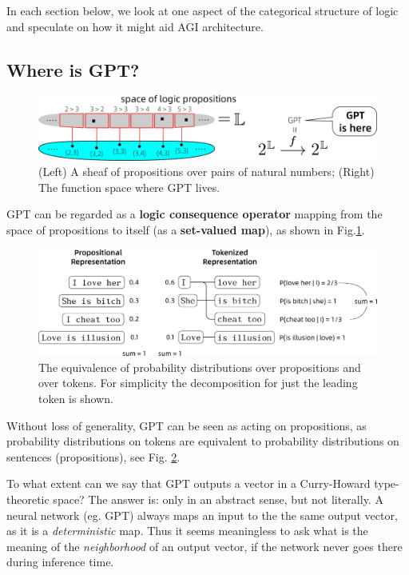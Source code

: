 \documentclass[runningheads]{llncs}
\begin{document}
In each section below, we look at one aspect of the categorical structure of logic and speculate on how it might aid AGI architecture.

\subsection{Where is GPT?}

\begin{figure}
	\includegraphics[scale=.5]{GPT-is-here.png}
	\caption{(Left) A sheaf of propositions over pairs of natural numbers; (Right) The function space where GPT lives.}
	\label{fig:GPT-is-here}
\end{figure}

GPT \cite{chatGPT2020} can be regarded as a \textbf{logic consequence operator} mapping from the space of propositions to itself (as a \textbf{set-valued map}), as shown in Fig.\ref{fig:GPT-is-here}.

\begin{figure}
	\includegraphics[scale=.4]{I-love-her-she-is-bitch.png}	%
	\caption{The equivalence of probability distributions over propositions and over tokens. For simplicity the decomposition for just the leading token is shown.} \label{fig:she-is-bitch}
\end{figure}

Without loss of generality, GPT can be seen as acting on propositions, as probability distributions on tokens are equivalent to probability distributions on sentences (propositions), see Fig. \ref{fig:she-is-bitch}.

To what extent can we say that GPT outputs a vector in a Curry-Howard type-theoretic space?  The answer is: only in an abstract sense, but not literally.  A neural network (eg. GPT) always maps an input to the the same output vector, as it is a \textit{deterministic} map. Thus it seems meaningless to ask what is the meaning of the \textit{neighborhood} of an output vector, if the network never goes there during inference time.
\end{document}
